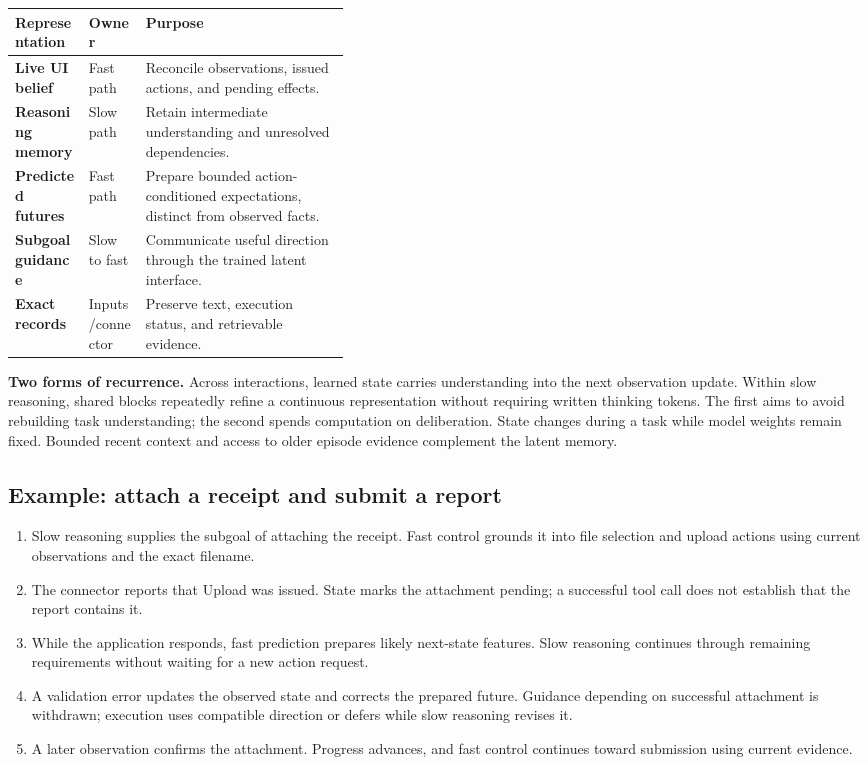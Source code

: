 \documentclass[11pt,letterpaper]{article}
\begin{document}
\begin{tabularx}{\linewidth}{@{}>{\bfseries}p{0.22\linewidth}p{0.17\linewidth}X@{}}
\toprule
Representation & Owner & Purpose \\
\midrule
Live UI belief & Fast path & Reconcile observations, issued actions, and pending effects. \\
Reasoning memory & Slow path & Retain intermediate understanding and unresolved dependencies. \\
Predicted futures & Fast path & Prepare bounded action-conditioned expectations, distinct from observed facts. \\
Subgoal guidance & Slow to fast & Communicate useful direction through the trained latent interface. \\
Exact records & Inputs/connector & Preserve text, execution status, and retrievable evidence. \\
\bottomrule
\end{tabularx}

\textbf{Two forms of recurrence.} Across interactions, learned state carries understanding into the next observation update. Within slow reasoning, shared blocks repeatedly refine a continuous representation without requiring written thinking tokens. The first aims to avoid rebuilding task understanding; the second spends computation on deliberation. State changes during a task while model weights remain fixed. Bounded recent context and access to older episode evidence complement the latent memory.

\subsection{Example: attach a receipt and submit a report}
\begin{enumerate}
\item Slow reasoning supplies the subgoal of attaching the receipt. Fast control grounds it into file selection and upload actions using current observations and the exact filename.
\item The connector reports that Upload was issued. State marks the attachment pending; a successful tool call does not establish that the report contains it.
\item While the application responds, fast prediction prepares likely next-state features. Slow reasoning continues through remaining requirements without waiting for a new action request.
\item A validation error updates the observed state and corrects the prepared future. Guidance depending on successful attachment is withdrawn; execution uses compatible direction or defers while slow reasoning revises it.
\item A later observation confirms the attachment. Progress advances, and fast control continues toward submission using current evidence.
\end{enumerate}
\end{document}
